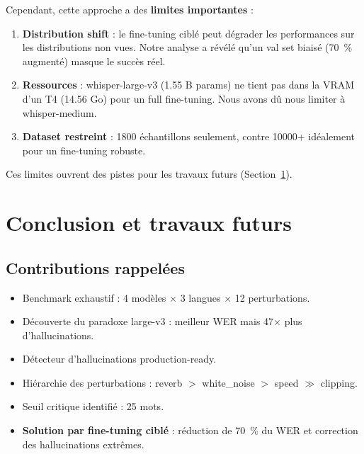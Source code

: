 \documentclass[11pt,a4paper]{article}
\begin{document}
Cependant, cette approche a des \textbf{limites importantes} :

\begin{enumerate}
	\item \textbf{Distribution shift} : le fine-tuning ciblé peut dégrader
	les performances sur les distributions non vues. Notre analyse a
	révélé qu'un val set biaisé (70~\% augmenté) masque le succès réel.
	
	\item \textbf{Ressources} : whisper-large-v3 (1.55 B params) ne tient
	pas dans la VRAM d'un T4 (14.56 Go) pour un full fine-tuning. Nous
	avons dû nous limiter à whisper-medium.
	
	\item \textbf{Dataset restreint} : 1800 échantillons seulement, contre
	10000+ idéalement pour un fine-tuning robuste.
\end{enumerate}

Ces limites ouvrent des pistes pour les travaux futurs (Section~\ref{sec:conclusion}).


\section{Conclusion et travaux futurs}
\label{sec:conclusion}

\subsection{Contributions rappelées}

\begin{itemize}
	\item Benchmark exhaustif : 4 modèles $\times$ 3 langues $\times$ 12
	perturbations.
	\item Découverte du paradoxe large-v3 : meilleur WER mais 47$\times$ plus
	d'hallucinations.
	\item Détecteur d'hallucinations production-ready.
	\item Hiérarchie des perturbations : reverb $>$ white\_noise $>$ speed
	$\gg$ clipping.
	\item Seuil critique identifié : 25 mots.
	\item \textbf{Solution par fine-tuning ciblé} : réduction de 70~\% du WER
	et correction des hallucinations extrêmes.
\end{itemize}
\end{document}
